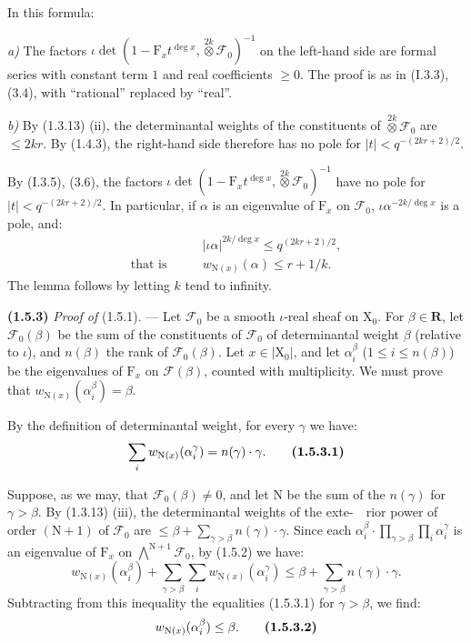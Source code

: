 \documentclass[11pt,leqno]{article}
\newcommand{\Page}[1]{\ifvmode\noindent\else\unskip\ \fi{\footnotesize\textcolor{gray}{[p.\,#1]}}\ \ignorespaces}
\begin{document}
In this formula:

\textit{a)} The factors \(\iota\det(1-\mathrm{F}_x t^{\deg x},\mathop{\otimes}\limits^{2k}\mathcal{F}_0)^{-1}\) on the left-hand side are formal series with constant term \(1\) and real coefficients \(\ge0\). The proof is as in (I.3.3), (3.4), with “rational” replaced by “real”.

\textit{b)} By (1.3.13) (ii), the determinantal weights of the constituents of \(\mathop{\otimes}\limits^{2k}\mathcal{F}_0\) are \(\le2kr\). By (1.4.3), the right-hand side therefore has no pole for \(|t|<q^{-(2kr+2)/2}\).

By (I.3.5), (3.6), the factors \(\iota\det(1-\mathrm{F}_x t^{\deg x},\mathop{\otimes}\limits^{2k}\mathcal{F}_0)^{-1}\) have no pole for \(|t|<q^{-(2kr+2)/2}\). In particular, if \(\alpha\) is an eigenvalue of \(\mathrm{F}_x\) on \(\mathcal{F}_0\), \(\iota\alpha^{-2k/\deg x}\) is a pole, and:
\begin{align*}
&|\iota\alpha|^{2k/\deg x}\le q^{(2kr+2)/2},\\
\text{that is}\qquad &w_{\mathrm{N}(x)}(\alpha)\le r+1/k.
\end{align*}
The lemma follows by letting \(k\) tend to infinity.

\textbf{(1.5.3)} \textit{Proof of} (1.5.1). — Let \(\mathcal{F}_0\) be a smooth \(\iota\)-real sheaf on \(\mathrm{X}_0\). For \(\beta\in\mathbf{R}\), let \(\mathcal{F}_0(\beta)\) be the sum of the constituents of \(\mathcal{F}_0\) of determinantal weight \(\beta\) (relative to \(\iota\)), and \(n(\beta)\) the rank of \(\mathcal{F}_0(\beta)\). Let \(x\in|\mathrm{X}_0|\), and let \(\alpha_i^\beta\) (\(1\le i\le n(\beta)\)) be the eigenvalues of \(\mathrm{F}_x\) on \(\mathcal{F}(\beta)\), counted with multiplicity. We must prove that \(w_{\mathrm{N}(x)}(\alpha_i^\beta)=\beta\).

By the definition of determinantal weight, for every \(\gamma\) we have:
\[
\sum_i w_{\mathrm{N}(x)}(\alpha_i^\gamma)=n(\gamma)\cdot\gamma.
\tag*{\textbf{(1.5.3.1)}}
\]

Suppose, as we may, that \(\mathcal{F}_0(\beta)\ne0\), and let \(\mathrm{N}\) be the sum of the \(n(\gamma)\) for \(\gamma>\beta\). By (1.3.13) (iii), the determinantal weights of the exte-\Page{165}rior power of order \((\mathrm{N}+1)\) of \(\mathcal{F}_0\) are \(\le\beta+\sum\limits_{\gamma>\beta}n(\gamma)\cdot\gamma\). Since each \(\alpha_i^\beta\cdot\prod\limits_{\gamma>\beta}\prod\limits_i \alpha_i^\gamma\) is an eigenvalue of \(\mathrm{F}_x\) on \(\bigwedge\limits^{\mathrm{N}+1}\mathcal{F}_0\), by (1.5.2) we have:
\[
w_{\mathrm{N}(x)}(\alpha_i^\beta)
+\sum_{\gamma>\beta}\sum_i w_{\mathrm{N}(x)}(\alpha_i^\gamma)
\le\beta+\sum_{\gamma>\beta}n(\gamma)\cdot\gamma.
\]
Subtracting from this inequality the equalities (1.5.3.1) for \(\gamma>\beta\), we find:
\[
w_{\mathrm{N}(x)}(\alpha_i^\beta)\le\beta.
\tag*{\textbf{(1.5.3.2)}}
\]
\end{document}
